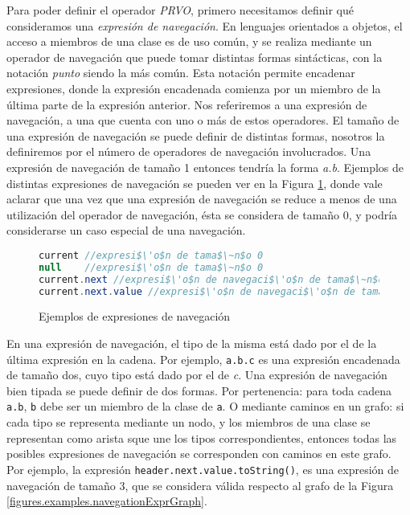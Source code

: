 Para poder definir el operador \emph{PRVO}, primero necesitamos definir qu\'e consideramos una \emph{expresi\'on de navegaci\'on}. En lenguajes orientados a objetos, el acceso a miembros de una clase es de uso com\'un, y se realiza mediante un operador de navegaci\'on que puede tomar distintas formas sint\'acticas, con la notaci\'on \emph{punto} siendo la m\'as com\'un. Esta notaci\'on permite encadenar expresiones, donde la expresi\'on encadenada comienza por un miembro de la \'ultima parte de la expresi\'on anterior. Nos referiremos a una expresi\'on de navegaci\'on, a una que cuenta con uno o m\'as de estos operadores. El tama\~no de una expresi\'on de navegaci\'on se puede definir de distintas formas, nosotros la definiremos por el n\'umero de operadores de navegaci\'on involucrados. Una expresi\'on de navegaci\'on de tama\~no 1 entonces tendr\'ia la forma \emph{a.b}. Ejemplos de distintas expresiones de navegaci\'on se pueden ver en la Figura \ref{figures.examples.chainedExpr}, donde vale aclarar que una vez que una expresi\'on de navegaci\'on se reduce a menos de una utilizaci\'on del operador de navegaci\'on, \'esta se considera de tama\~no 0, y podr\'ia considerarse un caso especial de una navegaci\'on.

\begin{figure}
	\begin{lstlisting}[mathescape=true, language=Java, extendedchars=true]
current //expresi$\'o$n de tama$\~n$o 0
null 	//expresi$\'o$n de tama$\~n$o 0
current.next //expresi$\'o$n de navegaci$\'o$n de tama$\~n$o 1
current.next.value //expresi$\'o$n de navegaci$\'o$n de tama$\~n$o 2
	\end{lstlisting}
	\caption{Ejemplos de expresiones de navegaci\'on}
	\label{figures.examples.chainedExpr}
\end{figure}

En una expresi\'on de navegaci\'on, el tipo de la misma est\'a dado por el de la \'ultima expresi\'on en la cadena. Por ejemplo, \lstinline|a.b.c| es una expresi\'on encadenada de tama\~no dos, cuyo tipo est\'a dado por el de \emph{c}. Una expresi\'on de navegaci\'on bien tipada se puede definir de dos formas. Por pertenencia: para toda cadena \texttt{a.b}, \texttt{b} debe ser un miembro de la clase de \texttt{a}. O mediante caminos en un grafo: si cada tipo se representa mediante un nodo, y los miembros de una clase se representan como arista sque une los tipos correspondientes, entonces todas las posibles expresiones de navegaci\'on se corresponden con caminos en este grafo. Por ejemplo, la expresi\'on \lstinline|header.next.value.toString()|, es una expresi\'on de navegaci\'on de tama\~no 3, que se considera v\'alida respecto al grafo de la Figura \ref{figures.examples.navegationExprGraph}.

